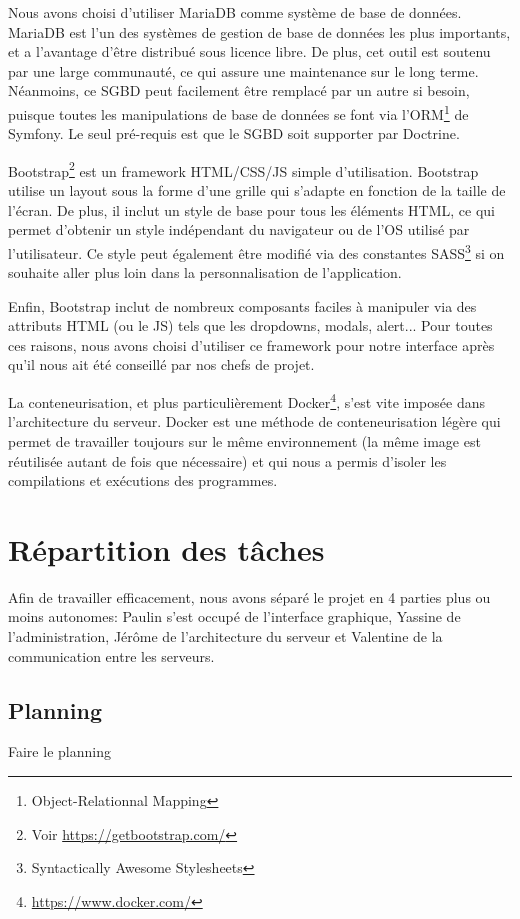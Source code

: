 \par Nous avons choisi d'utiliser MariaDB comme système de base de données. MariaDB est l'un des systèmes de gestion de base de données les plus importants, et a l'avantage d'être distribué sous licence libre. De plus, cet outil est soutenu par une large communauté, ce qui assure une maintenance sur le long terme. Néanmoins, ce SGBD peut facilement être remplacé par un autre si besoin, puisque toutes les manipulations de base de données se font via l'ORM\footnote{Object-Relationnal Mapping} de Symfony. Le seul pré-requis est que le SGBD soit supporter par Doctrine. \\

\par Bootstrap\footnote{Voir \url{https://getbootstrap.com/}} est un framework HTML/CSS/JS simple d'utilisation. Bootstrap utilise un layout sous la forme d'une grille qui s'adapte en fonction de la taille de l'écran. De plus, il inclut un style de base pour tous les éléments HTML, ce qui permet d'obtenir un style indépendant du navigateur ou de l'OS utilisé par l'utilisateur. Ce style peut également être modifié via des constantes SASS\footnote{Syntactically Awesome Stylesheets} si on souhaite aller plus loin dans la personnalisation de l'application. 
\par Enfin, Bootstrap inclut de nombreux composants faciles à manipuler via des attributs HTML (ou le JS) tels que les dropdowns, modals, alert... Pour toutes ces raisons, nous avons choisi d'utiliser ce framework pour notre interface après qu'il nous ait été conseillé par nos chefs de projet. \\

\par La conteneurisation, et plus particulièrement Docker\footnote{\url{https://www.docker.com/}}, s'est vite imposée dans l'architecture du serveur. Docker est une méthode de conteneurisation légère qui permet de travailler toujours sur le même environnement (la même image est réutilisée autant de fois que nécessaire) et qui nous a permis d'isoler les compilations et exécutions des programmes.

\section{Répartition des tâches}

\par Afin de travailler efficacement, nous avons séparé le projet en 4 parties plus ou moins autonomes: Paulin s'est occupé de l'interface graphique, Yassine de l'administration, Jérôme de l'architecture du serveur et Valentine de la communication entre les serveurs.

\subsection{Planning}

Faire le planning
